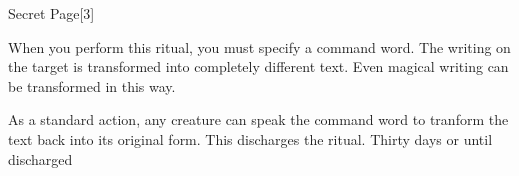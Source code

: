 \begin{spellsection}{Secret Page}[3]
    \begin{spellheader}
    \end{spellheader}
    \begin{spellcontent}
        \begin{spelltargetinginfo}
        \end{spelltargetinginfo}
        \begin{spelleffects}
            \spellspecial When you perform this ritual, you must specify a command word.
            \spelleffect The writing on the target is transformed into completely different text. Even magical writing can be transformed in this way.

            As a standard action, any creature can speak the command word to tranform the text back into its original form. This discharges the ritual.
            \spelldur Thirty days or until discharged
        \end{spelleffects}
    \end{spellcontent}
    \begin{spellfooter}
    \end{spellfooter}
    \begin{spellaugments}
    \end{spellaugments}
\end{spellsection}

